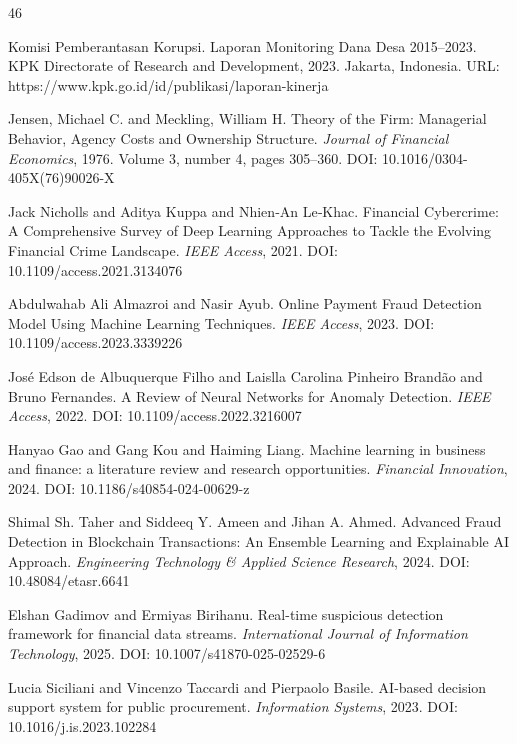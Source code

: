 \documentclass[3p,times,procedia]{elsarticle}
\begin{document}
\begin{thebibliography}{46}

Komisi Pemberantasan Korupsi.
Laporan Monitoring Dana Desa 2015--2023.
KPK Directorate of Research and Development, 2023.
Jakarta, Indonesia.
URL: https://www.kpk.go.id/id/publikasi/laporan-kinerja

Jensen, Michael C. and Meckling, William H.
Theory of the Firm: Managerial Behavior, Agency Costs and Ownership Structure.
\textit{Journal of Financial Economics}, 1976.
Volume 3, number 4, pages 305--360.
DOI: 10.1016/0304-405X(76)90026-X

Jack Nicholls and Aditya Kuppa and Nhien‐An Le‐Khac.
Financial Cybercrime: A Comprehensive Survey of Deep Learning Approaches to Tackle the Evolving Financial Crime Landscape.
\textit{IEEE Access}, 2021.
DOI: 10.1109/access.2021.3134076

Abdulwahab Ali Almazroi and Nasir Ayub.
Online Payment Fraud Detection Model Using Machine Learning Techniques.
\textit{IEEE Access}, 2023.
DOI: 10.1109/access.2023.3339226

José Edson de Albuquerque Filho and Laislla Carolina Pinheiro Brandão and Bruno Fernandes.
A Review of Neural Networks for Anomaly Detection.
\textit{IEEE Access}, 2022.
DOI: 10.1109/access.2022.3216007

Hanyao Gao and Gang Kou and Haiming Liang.
Machine learning in business and finance: a literature review and research opportunities.
\textit{Financial Innovation}, 2024.
DOI: 10.1186/s40854-024-00629-z

Shimal Sh. Taher and Siddeeq Y. Ameen and Jihan A. Ahmed.
Advanced Fraud Detection in Blockchain Transactions: An Ensemble Learning and Explainable AI Approach.
\textit{Engineering Technology \& Applied Science Research}, 2024.
DOI: 10.48084/etasr.6641

Elshan Gadimov and Ermiyas Birihanu.
Real-time suspicious detection framework for financial data streams.
\textit{International Journal of Information Technology}, 2025.
DOI: 10.1007/s41870-025-02529-6

Lucia Siciliani and Vincenzo Taccardi and Pierpaolo Basile.
AI-based decision support system for public procurement.
\textit{Information Systems}, 2023.
DOI: 10.1016/j.is.2023.102284


\end{thebibliography}
\end{document}
